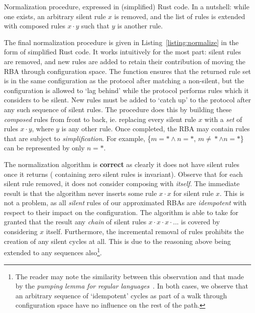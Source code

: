 \begin{listing}[ht]
	\inputminted[]{rust}{normalize.rs}
	\caption[Normalization procedure Rusty-pseudocode.]{Normalization procedure, expressed in (simplified) Rust code. In a nutshell: while one exists, an arbitrary silent rule $x$ is removed, and the list of rules is extended with composed rules $x\cdot{}y$ such that $y$ is another rule.}
	\label{listing:normalize}
\end{listing}

The final normalization procedure is given in Listing~\ref{listing:normalize} in the form of simplified Rust code. It works intuitively for the most part: silent rules are removed, and new rules are added to retain their contribution of moving the RBA through configuration space. The function  ensures that the returned rule set is in the same configuration as the protocol after matching a non-silent, but the configuration is allowed to `lag behind' while the protocol performs rules which it considers to be silent. New rules must be added to `catch up' to the protocol after any such sequence of silent rules. The procedure does this by building these \textit{composed} rules from front to back, ie. replacing every silent rule $x$ with a \textit{set} of rules $x\cdot{}y$, where $y$ is any other rule. Once completed, the RBA may contain rules that are subject to \textit{simplification}. For example, \{$m=*\wedge{}n=*$, $m\neq{}*\wedge{}n=*$\} can be represented by only $n=*$.

The normalization algorithm is \textbf{correct} as clearly it does not have silent rules once it returns ( containing zero silent rules is invariant). Observe that for each silent rule removed, it does not consider composing with \textit{itself}. The immediate result is that the algorithm never inserts some rule $x\cdot{}x$ for silent rule $x$. This is not a problem, as all \textit{silent} rules of our approximated RBAs are \textit{idempotent} with respect to their impact on the configuration. The algorithm is able to take for granted that the result any \textit{chain} of silent rules $x\cdot{}x\cdot{}x\cdot{}...$ is covered by considering $x$ itself. Furthermore, the incremental removal of rules prohibits the creation of any silent cycles at all. This is due to the reasoning above being extended to any sequences also\footnote{The reader may note the similarity between this observation and that made by the \textit{pumping lemma for regular languages}~\cite{linz2006introduction}. In both cases, we observe that an arbitrary sequence of `idempotent' cycles as part of a walk through configuration space have no influence on the rest of the path.}. 


